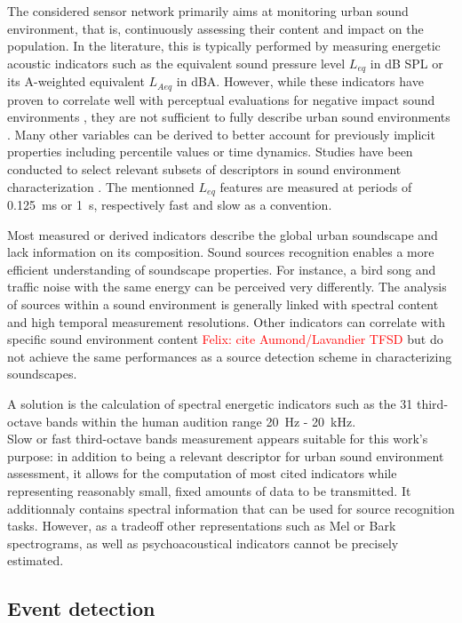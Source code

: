 \documentclass[final,3p,times,twocolumn]{elsarticle}
\newcommand{\fg}[1]{\textcolor{red}{ Felix: #1}}
\begin{document}
The considered sensor network primarily aims at monitoring urban sound environment, that is, continuously assessing their content and impact on the population. In the literature, this is typically performed by measuring energetic acoustic indicators such as the equivalent sound pressure level $L_{eq}$ in dB SPL or its A-weighted equivalent $L_{Aeq}$ in dBA. However, while these indicators have proven to correlate well with perceptual evaluations for negative impact sound environments \cite{gozalo2015}, they are not sufficient to fully describe urban sound environments \cite{rychtarikova2013}. Many other variables can be derived to better account for previously implicit properties \cite{can2016} including percentile values or time dynamics. Studies have been conducted to select relevant subsets of descriptors in sound environment characterization \cite{can2015, brocolini2013, nilsson2007}. The mentionned $L_{eq}$ features are measured at periods of 0.125~ms or 1~s, respectively fast and slow as a convention.

Most measured or derived indicators describe the global urban soundscape and lack information on its composition. Sound sources recognition enables a more efficient understanding of soundscape properties. For instance, a bird song and traffic noise with the same energy can be perceived very differently. The analysis of sources within a sound environment is generally linked with spectral content \cite{ishiyama2000} and high temporal measurement resolutions. Other indicators can correlate with specific sound environment content \fg{cite Aumond/Lavandier TFSD} but do not achieve the same performances as a source detection scheme in characterizing soundscapes.


A solution is the calculation of spectral energetic indicators such as the 31 third-octave bands within the human audition range 20~Hz - 20~kHz.\\ Slow or fast third-octave bands measurement appears suitable for this work's purpose: in addition to being a relevant descriptor \cite{torija2013} for urban sound environment assessment, it allows for the computation of most cited indicators while representing reasonably small, fixed amounts of data to be transmitted. It additionnaly contains spectral information that can be used for source recognition tasks. However, as a tradeoff other representations such as Mel or Bark spectrograms, as well as psychoacoustical indicators cannot be precisely estimated.

\subsection{Event detection}
\end{document}
